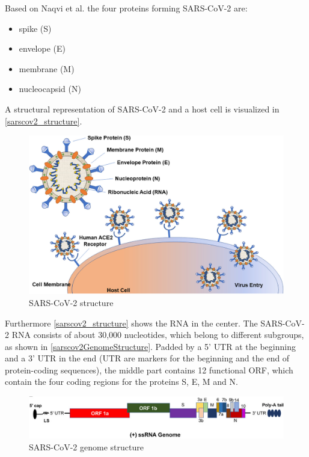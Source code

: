 Based on Naqvi et al. \cite{NAQVI2020165878} the four proteins forming \ac{SARS-CoV-2} are:
\begin{itemize}
	\item spike (S)
	\item envelope (E)
	\item membrane (M)
	\item nucleocapsid (N)
\end{itemize}

A structural representation of \ac{SARS-CoV-2} and a host cell is visualized in \autoref{sarscov2_structure}. \cite{NAQVI2020165878}

\begin{figure}[ht]
	\centering
	\includegraphics[width=0.8\linewidth]{figures/SARS-CoV-2Structure.jpg}
	\caption{SARS-CoV-2 structure \cite[p. 2]{NAQVI2020165878}}
	\label{sarscov2_structure}
\end{figure}

Furthermore \autoref{sarscov2_structure} shows the \ac{RNA} in the center. The \ac{SARS-CoV-2} \ac{RNA} consists of about 30,000 nucleotides, which belong to different subgroups, as shown in \autoref{sarscov2GenomeStructure}. 
Padded by a 5' \ac{UTR} at the beginning and a 3' \ac{UTR} in the end (\ac{UTR} are markers for the beginning and the end of protein-coding sequences), the middle part contains 12 functional \ac{ORF}, which contain the four coding regions for the proteins S, E, M and N. 

\begin{figure}[ht]
	\centering
	\includegraphics[width=1.0\linewidth]{figures/sarscov2GenomeStructure.png}
	\caption{\ac{SARS-CoV-2} genome structure \cite[p. 3]{NAQVI2020165878}}
	\label{sarscov2GenomeStructure}
\end{figure}

